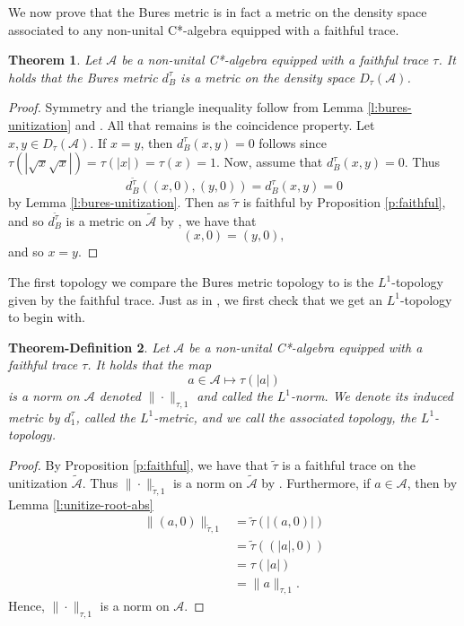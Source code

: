 \documentclass{amsart}
\theoremstyle{plain}
\newtheorem{theorem}{Theorem}[section]
\newtheorem{theorem-definition}[theorem]{Theorem-Definition}
\theoremstyle{definition}
\theoremstyle{remark}
\numberwithin{equation}{section}
\newcommand{\A}{{\mathcal{A}}}
\newcommand{\wt}[1]{{\widetilde{#1}}}
\begin{document}
 

We now prove that the Bures metric is in fact a metric on the density space associated to any non-unital C*-algebra equipped with a faithful trace.

\begin{theorem}\label{t:bures-metric-non-unital}
    Let $\A$ be a non-unital C*-algebra equipped with a faithful trace $\tau$. It holds that the Bures metric $d_B^\tau$ is a metric on the density space $D_\tau(\A)$.
\end{theorem}
\begin{proof}
 Symmetry and the triangle inequality follow from Lemma \ref{l:bures-unitization} and \cite[Theorem 2.6]{Farenick-Rahaman17}. All that remains is the coincidence property. Let $x,y \in D_\tau(\A)$. If $x=y$, then $d_B^\tau(x,y)=0$ follows since $\tau(|\sqrt{x}\sqrt{x}|)=\tau(|x|)=\tau(x)=1$.  Now, assume that $d_B^\tau(x,y)=0$. Thus 
 \[
 d_B^{\wt{\tau}}((x,0), (y,0))=d_B^\tau(x,y)=0
 \]
 by Lemma \ref{l:bures-unitization}. 
 Then as $\wt{\tau}$ is faithful by Proposition \ref{p:faithful}, and so $d_B^{\wt{\tau}}$ is a metric on $\wt{\A}$ by \cite[Theorem 2.6]{Farenick-Rahaman17}, we have that 
 \[
 (x,0)= (y,0),
 \]
and so $x=y.$
\end{proof}



The first topology we compare the Bures metric topology to is the $L^1$-topology given by the faithful trace. Just as in \cite{Farenick-Rahaman17}, we first check that we get an $L^1$-topology to begin with.

\begin{theorem-definition}\label{p:l1-trace-topology}
    Let $\A$ be a non-unital C*-algebra equipped with a faithful trace $\tau$. It holds that the map
    \[
    a\in \A \longmapsto \tau(|a|)
    \]
    is a norm on $\A$ denoted $\|\cdot \|_{\tau,1}$ and called the {\em $L^1$-norm}.  We denote its induced metric by $d_1^\tau$, called the {\em $L^1$-metric}, and we call the associated topology, {\em the $L^1$-topology}.
\end{theorem-definition}
\begin{proof}
    By Proposition \ref{p:faithful}, we have that $\wt{\tau}$ is a faithful trace on the unitization $\wt{\A}$.  Thus $\|\cdot\|_{\wt{\tau},1}$ is a norm on $\wt{\A}$ by \cite[Proposition 2.1]{Farenick-Rahaman17}. Furthermore, if $a\in \A$, then by Lemma \ref{l:unitize-root-abs}
    \begin{align*}
        \|(a,0)\|_{\wt{\tau},1}& = \wt{\tau}(|(a,0)|)\\
        &= \wt{\tau}((|a|,0))\\
        & =\tau(|a|)\\
        &= \|a\|_{\tau,1}.
    \end{align*}
    Hence, $\|\cdot\|_{\tau,1}$ is a norm on $\A$.
\end{proof}
\end{document}
